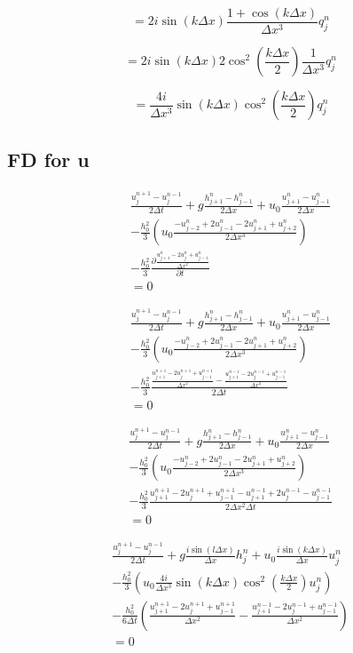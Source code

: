 \documentclass[12pt]{article}
\begin{document}
\[=2i\sin\left(k\Delta x\right)\frac{1 + \cos\left(k\Delta x\right)}{\Delta x^3} q^{n}_{j}\]

\[=2i\sin\left(k\Delta x\right) 2\cos^2\left(\frac{k\Delta x}{2}\right) \frac{1}{\Delta x^3} q^{n}_{j}\]

\[= \frac{4i}{\Delta x^3}\sin\left(k\Delta x\right)\cos^2\left(\frac{k\Delta x}{2}\right) q^{n}_{j}\]

\subsection{FD for u}
\begin{multline}
 \frac{u^{n+1}_j - u^{n-1}_j}{2\Delta t} + g\frac{h^n_{j+1} -h^n_{j-1} }{2\Delta x}   + u_0\frac{u^n_{j+1} -u^n_{j-1} }{2\Delta x} \\- \frac{h_0^2}{3}\left(u_0 \frac{-u^{n}_{j-2} +2u^{n}_{j-1} -2u^{n}_{j+1} +u^{n}_{j+2}}{2\Delta x^3}  \right)  \\
 - \frac{h_0^2}{3}\frac{\partial \frac{u^{n}_{j+1} -2u^{n}_{j} +u^{n}_{j-1}}{\Delta x^2}}{\partial t} 
 \\ = 0
\end{multline}

\begin{multline}
\frac{u^{n+1}_j - u^{n-1}_j}{2\Delta t} + g\frac{h^n_{j+1} -h^n_{j-1} }{2\Delta x}   + u_0\frac{u^n_{j+1} -u^n_{j-1} }{2\Delta x} \\- \frac{h_0^2}{3}\left(u_0 \frac{-u^{n}_{j-2} +2u^{n}_{j-1} -2u^{n}_{j+1} +u^{n}_{j+2}}{2\Delta x^3}  \right)  \\
- \frac{h_0^2}{3}\frac{\frac{u^{n+1}_{j+1} -2u^{n+1}_{j} +u^{n+1}_{j-1}}{\Delta x^2} - \frac{u^{n-1}_{j+1} -2u^{n-1}_{j} +u^{n-1}_{j-1}}{\Delta x^2}}{2\Delta t} 
\\ = 0
\end{multline}

\begin{multline}
\frac{u^{n+1}_j - u^{n-1}_j}{2\Delta t} + g\frac{h^n_{j+1} -h^n_{j-1} }{2\Delta x}   + u_0\frac{u^n_{j+1} -u^n_{j-1} }{2\Delta x} \\- \frac{h_0^2}{3}\left(u_0 \frac{-u^{n}_{j-2} +2u^{n}_{j-1} -2u^{n}_{j+1} +u^{n}_{j+2}}{2\Delta x^3}  \right)  \\
- \frac{h_0^2}{3}\frac{u^{n+1}_{j+1} -2u^{n+1}_{j} +u^{n+1}_{j-1} - u^{n-1}_{j+1} +2u^{n-1}_{j} -u^{n-1}_{j-1}}{2\Delta x^2\Delta t} 
\\ = 0
\end{multline}

\begin{multline}
\frac{u^{n+1}_j - u^{n-1}_j}{2\Delta t} + g\frac{i \sin\left(l \Delta x\right)}{\Delta x} h^n_j + u_0\frac{i \sin\left(k \Delta x\right)}{\Delta x} u^n_j \\- \frac{h_0^2}{3}\left(u_0 \frac{4i}{\Delta x^3}\sin\left(k\Delta x\right) \cos^2\left(\frac{k\Delta x}{2}\right) u^{n}_{j}  \right)  \\
- \frac{h_0^2}{6 \Delta t} \left(\frac{u^{n+1}_{j+1} -2u^{n+1}_{j} +u^{n+1}_{j-1}}{\Delta x^2} -\frac{u^{n-1}_{j+1} -2u^{n-1}_{j} +u^{n-1}_{j-1}}{\Delta x^2}  \right)
\\ = 0
\end{multline}
\end{document}
